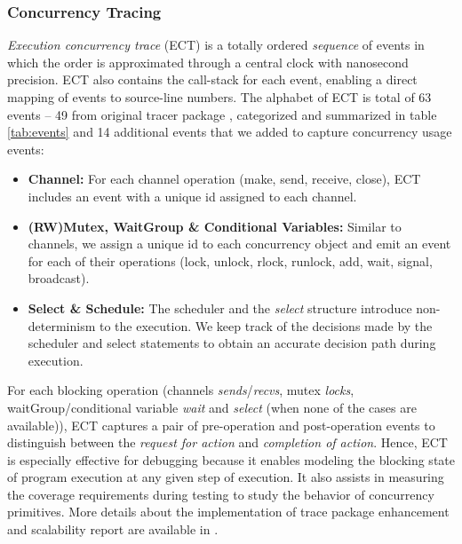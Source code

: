 \subsubsection{Concurrency Tracing}
\textit{Execution concurrency trace} (ECT) is a totally ordered \textit{sequence} of events in which the order is approximated through a central clock with nanosecond precision.
%
ECT also contains the call-stack for each event, enabling a direct mapping of events to source-line numbers.
%
The alphabet of ECT is total of 63 events -- 49 from original tracer package \cite{goParserSource}, categorized and summarized in table \ref{tab:events} and 14 additional events that we added to capture concurrency usage events:
%
\begin{itemize}
    \item \textbf{Channel:} For each channel operation (make, send, receive, close), ECT includes an event with a unique id assigned to each channel.
    \item \textbf{(RW)Mutex, WaitGroup \& Conditional Variables:} Similar to channels, we assign a unique id to each concurrency object and emit an event for each of their operations (lock, unlock, rlock, runlock, add, wait, signal, broadcast).
    \item \textbf{Select \& Schedule:} The scheduler and the \textit{select} structure introduce non-determinism to the execution. We keep track of the decisions made by the scheduler and select statements to obtain an accurate decision path during execution.
\end{itemize}



%
For each blocking operation (channels \textit{sends}/\textit{recvs}, mutex \textit{locks}, waitGroup/conditional variable \textit{wait} and \textit{select} (when none of the cases are available)), ECT captures a pair of pre-operation and post-operation events to distinguish between the \textit{request for action} and \textit{completion of action}.
%
Hence, ECT is especially effective for debugging because it enables modeling the blocking state of program execution at any given step of execution.
%
It also assists in measuring the coverage requirements during testing to study the behavior of concurrency primitives.
%
More details about the implementation of trace package enhancement and scalability report are available in \cite{ect-arxiv}.

